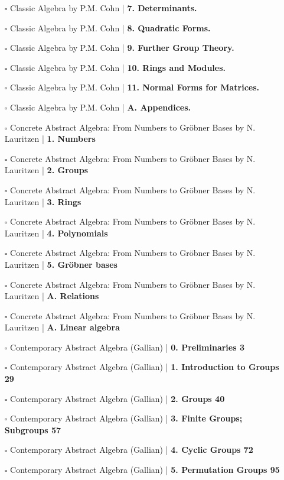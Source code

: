 \documentclass[a4, landscape, 12pt]{article}
\newcommand{\checkbox}{$\square$}%
\begin{document}
\begin{itemize}
{}
\item [\checkbox] Classic Algebra by P.M. Cohn  | \textbf{7. Determinants.
}
\item [\checkbox] Classic Algebra by P.M. Cohn  | \textbf{8. Quadratic Forms.
}
\item [\checkbox] Classic Algebra by P.M. Cohn  | \textbf{9. Further Group Theory.
}
\item [\checkbox] Classic Algebra by P.M. Cohn  | \textbf{10. Rings and Modules.
}
\item [\checkbox] Classic Algebra by P.M. Cohn  | \textbf{11. Normal Forms for Matrices.
}
\item [\checkbox] Classic Algebra by P.M. Cohn  | \textbf{A. Appendices.
}
\item [\checkbox] Concrete Abstract Algebra: From Numbers to Gröbner Bases by N. Lauritzen  | \textbf{1. Numbers
}
\item [\checkbox] Concrete Abstract Algebra: From Numbers to Gröbner Bases by N. Lauritzen  | \textbf{2. Groups
}
\item [\checkbox] Concrete Abstract Algebra: From Numbers to Gröbner Bases by N. Lauritzen  | \textbf{3. Rings
}
\item [\checkbox] Concrete Abstract Algebra: From Numbers to Gröbner Bases by N. Lauritzen  | \textbf{4. Polynomials
}
\item [\checkbox] Concrete Abstract Algebra: From Numbers to Gröbner Bases by N. Lauritzen  | \textbf{5. Gröbner bases
}
\item [\checkbox] Concrete Abstract Algebra: From Numbers to Gröbner Bases by N. Lauritzen  | \textbf{A. Relations
}
\item [\checkbox] Concrete Abstract Algebra: From Numbers to Gröbner Bases by N. Lauritzen  | \textbf{A. Linear algebra
}
\item [\checkbox] Contemporary Abstract Algebra (Gallian)  | \textbf{0. Preliminaries 3
}
\item [\checkbox] Contemporary Abstract Algebra (Gallian)  | \textbf{1. Introduction to Groups 29
}
\item [\checkbox] Contemporary Abstract Algebra (Gallian)  | \textbf{2. Groups 40
}
\item [\checkbox] Contemporary Abstract Algebra (Gallian)  | \textbf{3. Finite Groups; Subgroups 57
}
\item [\checkbox] Contemporary Abstract Algebra (Gallian)  | \textbf{4. Cyclic Groups 72
}
\item [\checkbox] Contemporary Abstract Algebra (Gallian)  | \textbf{5. Permutation Groups 95
}
\end{itemize}
\end{document}

